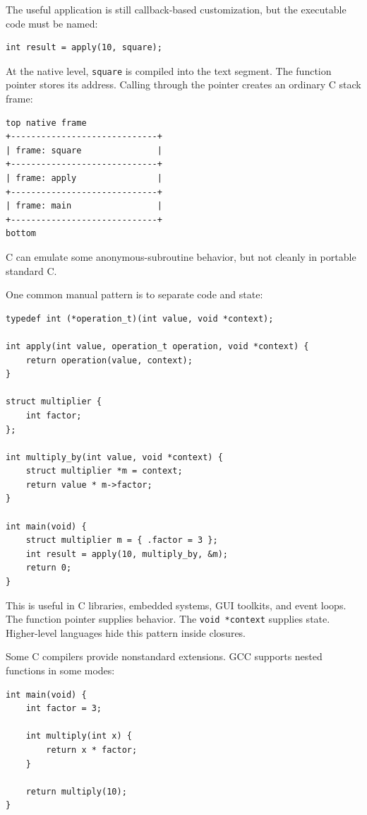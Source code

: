 The useful application is still callback-based customization, but the executable code must be named:

\begin{verbatim}
int result = apply(10, square);
\end{verbatim}

At the native level, \texttt{square} is compiled into the text segment. The function pointer stores its address. Calling through the pointer creates an ordinary C stack frame:

\begin{verbatim}
top native frame
+-----------------------------+
| frame: square               |
+-----------------------------+
| frame: apply                |
+-----------------------------+
| frame: main                 |
+-----------------------------+
bottom
\end{verbatim}

C can emulate some anonymous-subroutine behavior, but not cleanly in portable standard C.

One common manual pattern is to separate code and state:

\begin{verbatim}
typedef int (*operation_t)(int value, void *context);

int apply(int value, operation_t operation, void *context) {
    return operation(value, context);
}

struct multiplier {
    int factor;
};

int multiply_by(int value, void *context) {
    struct multiplier *m = context;
    return value * m->factor;
}

int main(void) {
    struct multiplier m = { .factor = 3 };
    int result = apply(10, multiply_by, &m);
    return 0;
}
\end{verbatim}

This is useful in C libraries, embedded systems, GUI toolkits, and event loops. The function pointer supplies behavior. The \texttt{void *context} supplies state. Higher-level languages hide this pattern inside closures.

Some C compilers provide nonstandard extensions. GCC supports nested functions in some modes:

\begin{verbatim}
int main(void) {
    int factor = 3;

    int multiply(int x) {
        return x * factor;
    }

    return multiply(10);
}
\end{verbatim}

